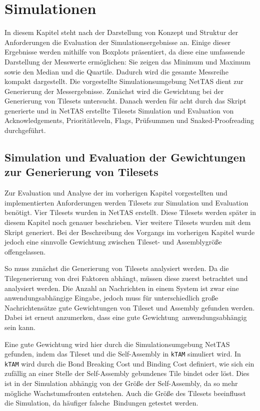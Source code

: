 \chapter{Simulationen}
\label{cha:simulationen}

In diesem Kapitel steht nach der Darstellung von Konzept und Struktur der Anforderungen die Evaluation der Simulationsergebnisse an. Einige dieser Ergebnisse werden mithilfe von Boxplots präsentiert, da diese eine umfassende Darstellung der Messwerte ermöglichen: Sie zeigen das Minimum und Maximum sowie den Median und die Quartile. Dadurch wird die gesamte Messreihe kompakt dargestellt. Die vorgestellte Simulationsumgebung NetTAS dient zur Generierung der Messergebnisse. Zunächst wird die Gewichtung bei der Generierung von Tilesets untersucht. Danach werden für acht durch das Skript generierte und in NetTAS erstellte Tilesets Simulation und Evaluation von Acknowledgements, Prioritätleveln, Flags, Prüfsummen und Snaked-Proofreading durchgeführt.

\section{Simulation und Evaluation der Gewichtungen zur Generierung von Tilesets}

Zur Evaluation und Analyse der im vorherigen Kapitel vorgestellten und implementierten Anforderungen werden Tilesets zur Simulation und Evaluation benötigt. Vier Tilesets wurden in NetTAS erstellt. Diese Tilesets werden später in diesem Kapitel noch genauer beschrieben. Vier weitere Tilesets wurden mit dem Skript generiert. Bei der Beschreibung des Vorgangs im vorherigen Kapitel wurde jedoch eine sinnvolle Gewichtung zwischen Tileset- und Assemblygröße offengelassen.

So muss zunächst die Generierung von Tilesets analysiert werden. Da die Tilegenerierung von drei Faktoren abhängt, müssen diese zuerst betrachtet und analysiert werden. Die Anzahl an Nachrichten in einem System ist zwar eine anwendungsabhängige Eingabe, jedoch muss für unterschiedlich große Nachrichtensätze gute Gewichtungen von Tileset und Assembly gefunden werden. Dabei ist erneut anzumerken, dass eine \glqq gute Gewichtung\grqq\, anwendungsabhängig sein kann.

Eine gute Gewichtung wird hier durch die Simulationsumgebung NetTAS gefunden, indem das Tileset und die Self-Assembly in \texttt{kTAM} simuliert wird. In \texttt{kTAM} wird durch die Bond Breaking Cost und Binding Cost definiert, wie sich ein zufällig an einer Stelle der Self-Assembly gebundenes Tile bindet oder löst. Dies ist in der Simulation abhängig von der Größe der Self-Assembly, da so mehr mögliche Wachstumsfronten entstehen. Auch die Größe des Tilesets beeinflusst die Simulation, da häufiger \glqq falsche\grqq\, Bindungen getestet werden. 


